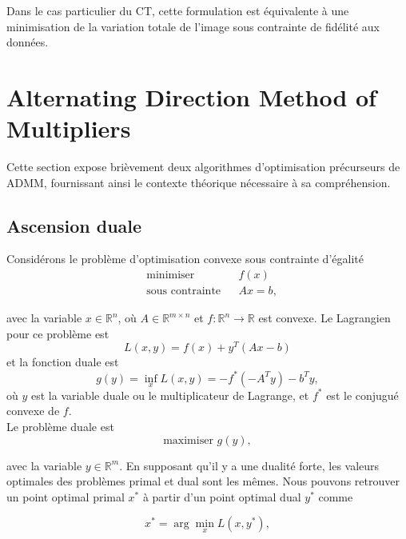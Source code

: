 Dans le cas particulier du CT, cette formulation est équivalente à une minimisation de la variation totale de l'image sous contrainte de fidélité aux données.

\section{Alternating Direction Method of Multipliers}
Cette section expose brièvement deux algorithmes d'optimisation précurseurs de ADMM, fournissant ainsi le contexte théorique nécessaire à sa compréhension.

\subsection{Ascension duale}
Considérons le problème d'optimisation convexe sous contrainte d'égalité
\begin{equation}
    \begin{aligned}
        & \text{minimiser} && f(x) \\
        & \text{sous contrainte} && Ax = b,
    \end{aligned}
    \label{eq:optimisation_convexe}
\end{equation}

avec la variable \( x \in \mathbb{R}^n \), où \( A \in \mathbb{R}^{m \times n} \) et \( f : \mathbb{R}^n \to \mathbb{R} \) est convexe.
Le Lagrangien pour ce problème est
\begin{equation}L(x, y) = f(x) + y^T(Ax - b)\end{equation}
et la fonction duale est
\begin{equation}g(y) = \inf_x L(x, y) = -f^*(-A^Ty) - b^Ty,\end{equation}
où \( y \) est la variable duale ou le multiplicateur de Lagrange, et \( f^* \) est le conjugué convexe de \( f \).\\
Le problème duale est
\begin{equation}\text{maximiser } g(y),\end{equation}

avec la variable \( y \in \mathbb{R}^m \). En supposant qu'il y a une dualité forte, les valeurs optimales des problèmes primal et dual sont les mêmes. Nous pouvons retrouver un point optimal primal \( x^* \) à partir d'un point optimal dual \( y^* \) comme

\begin{equation}x^* = \arg\min_x L(x, y^*),\end{equation}

